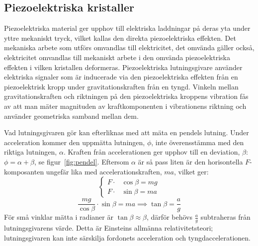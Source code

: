 \subsection{Piezoelektriska kristaller}
\label{sec:piezo}
Piezoelektriska material ger upphov till
elektriska laddningar på deras yta under yttre mekaniskt tryck,
vilket kallas den direkta piezoelektriska effekten.
Det mekaniska arbete som utförs omvandlas till elektricitet, det omvända gäller
också, elektricitet omvandlas till mekaniskt arbete i den omvända
piezoelektriska effekten i vilken kristallen deformeras.
\autocite{electronicdesign2016}
Piezoelektriska lutningsgivare använder elektriska signaler som är
inducerade via den piezoelektriska effekten från en piezoelektrisk kropp
under gravitationskraften från en tyngd.
Vinkeln mellan gravitationskraften och
riktningen på den piezoelektriska kroppens vibration
fås av att man mäter magnituden av kraftkomponenten i vibrationens riktning
och använder geometriska samband mellan dem.
\autocite{chiang00}

Vad lutningsgivaren gör kan efterliknas med att mäta en pendels lutning.
Under acceleration kommer den uppmätta lutningen, $\phi$,
inte överensstämma med den riktiga lutningen, $\alpha$.
Kraften från accelerationen ger upphov till en deviation, $\beta$:
$ \phi = \alpha + \beta $, se figur~\ref{fig:pendel}.
Eftersom $\alpha$ är så pass liten är den horisontella $F$-komposanten
ungefär lika med accelerationskraften, $ma$, vilket ger:
\begin{equation}
	\left\{ \begin{aligned}
		F \cdot &\cos \beta = mg \\
		F \cdot &\sin \beta = ma
	\end{aligned} \right.
\end{equation}
\begin{equation}
	\frac{mg}{\cos \beta} \cdot \sin \beta = ma \implies \tan \beta = \frac{a}{g}
\end{equation}
För små vinklar mätta i radianer är $ \tan \beta \approx \beta $,
därför behövs $ \frac{a}{g} $ subtraheras från lutningsgivarens värde.
Detta är Einsteins allmänna relativitetsteori;
lutningsgivaren kan inte särskilja fordonets acceleration och tyngdaccelerationen.
\autocite{lauri17}

